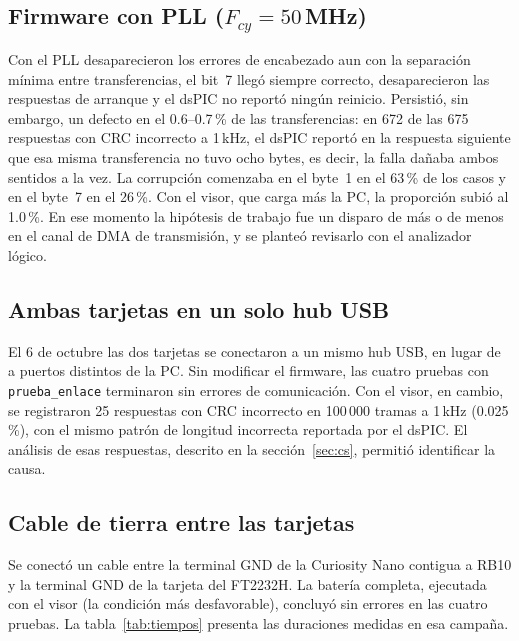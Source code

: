 \documentclass[11pt]{article}
\newcommand{\code}[1]{\texttt{#1}}
\begin{document}
\subsection{Firmware con PLL ($F_{cy} = 50$\,MHz)}

Con el PLL desaparecieron los errores de encabezado aun con la separación
mínima entre transferencias, el bit~7 llegó siempre correcto, desaparecieron
las respuestas de arranque y el dsPIC no reportó ningún reinicio. Persistió,
sin embargo, un defecto en el 0.6--0.7\,\% de las transferencias: en 672 de
las 675 respuestas con CRC incorrecto a 1\,kHz, el dsPIC reportó en la
respuesta siguiente que esa misma transferencia no tuvo ocho bytes, es decir,
la falla dañaba ambos sentidos a la vez. La corrupción comenzaba en el byte~1
en el 63\,\% de los casos y en el byte~7 en el 26\,\%. Con el visor, que
carga más la PC, la proporción subió al 1.0\,\%. En ese momento la hipótesis
de trabajo fue un disparo de más o de menos en el canal de DMA de
transmisión, y se planteó revisarlo con el analizador lógico.

\subsection{Ambas tarjetas en un solo hub USB}

El 6 de octubre las dos tarjetas se conectaron a un mismo hub USB, en lugar
de a puertos distintos de la PC. Sin modificar el firmware, las cuatro
pruebas con \code{prueba\_enlace} terminaron sin errores de comunicación. Con
el visor, en cambio, se registraron 25 respuestas con CRC incorrecto en
100\,000 tramas a 1\,kHz (0.025\,\%), con el mismo patrón de longitud
incorrecta reportada por el dsPIC. El análisis de esas respuestas, descrito
en la sección~\ref{sec:cs}, permitió identificar la causa.

\subsection{Cable de tierra entre las tarjetas}

Se conectó un cable entre la terminal GND de la Curiosity Nano contigua a
RB10 y la terminal GND de la tarjeta del FT2232H. La batería completa,
ejecutada con el visor (la condición más desfavorable), concluyó sin errores
en las cuatro pruebas. La tabla~\ref{tab:tiempos} presenta las duraciones
medidas en esa campaña.
\end{document}
